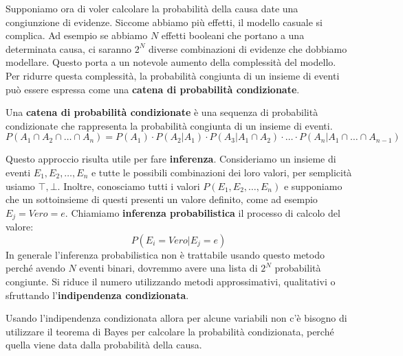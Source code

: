 Supponiamo ora di voler calcolare la probabilità della causa date una congiunzione
di evidenze. Siccome abbiamo più effetti, il modello casuale si complica.
Ad esempio se abbiamo $N$ effetti booleani che portano a una determinata causa,
ci saranno $2^N$ diverse combinazioni di evidenze che dobbiamo modellare.
Questo porta a un notevole aumento della complessità del modello.
Per ridurre questa complessità, la probabilità congiunta di un insieme di eventi può essere
espressa come una \textbf{catena di probabilità condizionate}.
\begin{definizione}
    Una \textbf{catena di probabilità condizionate} è una sequenza di probabilità
    condizionate che rappresenta la probabilità congiunta di un insieme di eventi.
    \begin{equation}
        P(A_1 \cap A_2 \cap \ldots \cap A_n) = P(A_1) \cdot P(A_2|A_1) \cdot
        P(A_3|A_1 \cap A_2) \cdot \ldots \cdot P(A_n|A_1 \cap \ldots \cap A_{n-1})
    \end{equation}
\end{definizione}
Questo approccio risulta utile per fare \textbf{inferenza}. Consideriamo un
insieme di eventi $E_1, E_2, \dots, E_n$ e tutte le possibili combinazioni dei
loro valori, per semplicità usiamo $\top, \bot$. Inoltre, conosciamo tutti i
valori $P(E_1, E_2, \dots, E_n)$ e supponiamo che un sottoinsieme di questi
presenti un valore definito, come ad esempio $E_j = Vero = e$.
Chiamiamo \textbf{inferenza probabilistica} il processo di calcolo del valore:
\begin{equation}
    P(E_i = Vero|E_j=e)
\end{equation}
In generale l'inferenza probabilistica non è trattabile usando questo metodo
perché avendo $N$ eventi binari, dovremmo avere una lista di $2^N$ probabilità congiunte.
Si riduce il numero utilizzando metodi approssimativi, qualitativi o sfruttando
l'\textbf{indipendenza condizionata}.

Usando l'indipendenza condizionata allora per alcune variabili non c'è bisogno di
utilizzare il teorema di Bayes per calcolare la probabilità condizionata, perché
quella viene data dalla probabilità della causa.

